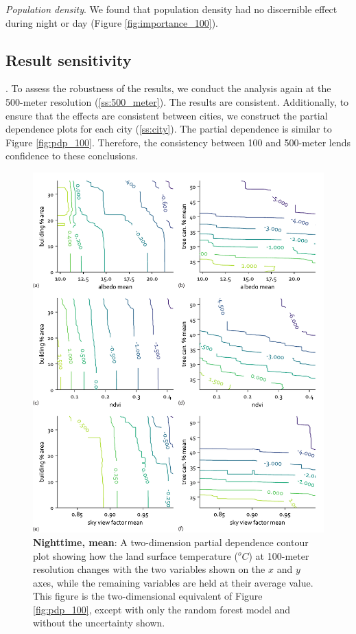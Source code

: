 \documentclass[final,3p,times,onecolumn,sort&compress]{elsarticle}
\begin{document}
\textit{Population density}.
We found that population density had no discernible effect during night or day (Figure \ref{fig:importance_100}).

\subsection{Result sensitivity}.
To assess the robustness of the results, we conduct the analysis again at the 500-meter resolution (\ref{ss:500_meter}).
The results are consistent.
Additionally, to ensure that the effects are consistent between cities, we construct the partial dependence plots for each city (\ref{ss:city}).
The partial dependence is similar to Figure \ref{fig:pdp_100}.
Therefore, the consistency between 100 and 500-meter lends confidence to these conclusions.

\begin{figure}
    \centering
    \includegraphics[width=\linewidth]{fig/report/pdp_2d_night_100.pdf}
    \caption{
    \textbf{Nighttime, mean}: A two-dimension partial dependence contour plot showing how the land surface temperature ($^oC$) at 100-meter resolution changes with the two variables shown on the $x$ and $y$ axes, while the remaining variables are held at their average value.
    This figure is the two-dimensional equivalent of Figure \ref{fig:pdp_100}, except with only the random forest model and without the uncertainty shown.
    }
    \label{fig:pdp_2dnight_100}
\end{figure}
\end{document}

